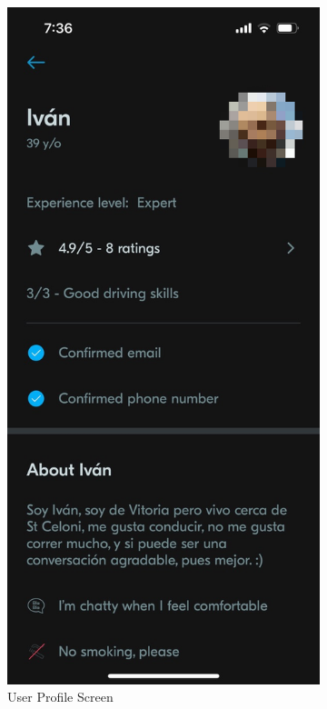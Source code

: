 \documentclass[a4paper, 12pt]{report} %
\begin{document}
\begin{figure}
\begin{subfigure}{0.3\textwidth}
                        \includegraphics[width=0.8\linewidth, height=0.9\textheight, keepaspectratio]{Images/Blablacar_userprofile.png}
                        \caption{User Profile Screen}
                        \label{fig:blabla_profile}
                    \end{subfigure}
                    \begin{subfigure}{0.3\textwidth}

\end{subfigure}
\end{figure}
\end{document}
